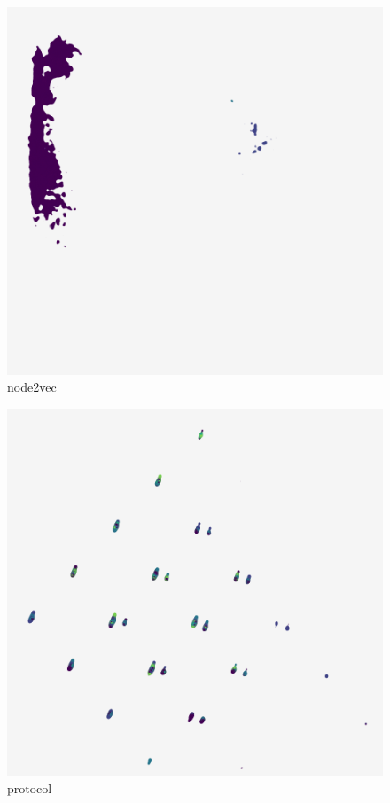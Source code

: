\begin{subfigure}[b]{.25\linewidth}
    \centering
    \includegraphics[width=\textwidth]{outputs/DRplots/plots/PCA_node2vec.png}
    \caption{node2vec}
    \label{fig:PCA_node2vec}
\end{subfigure}
\begin{subfigure}[b]{.25\linewidth}
    \centering
    \includegraphics[width=\textwidth]{outputs/DRplots/plots/PCA_protocol.png}
    \caption{protocol}
    \label{fig:PCA_protocol}
\end{subfigure}
